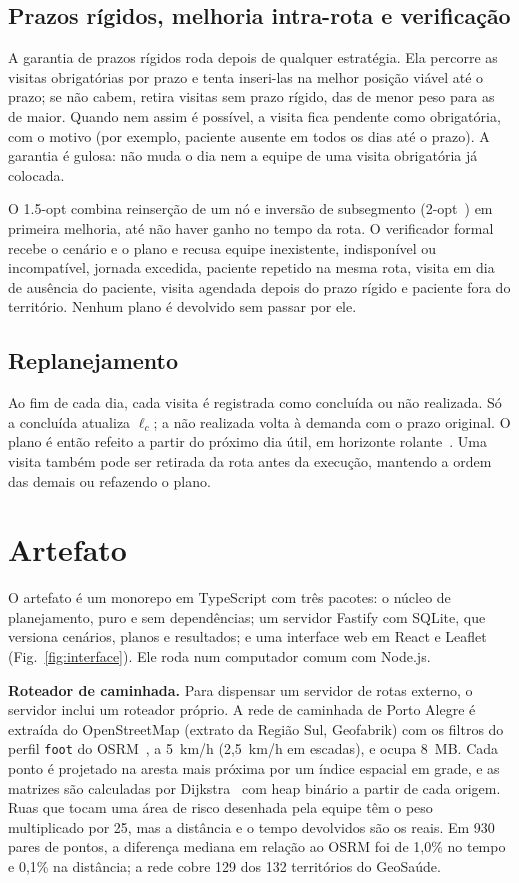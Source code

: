 \documentclass[conference,a4paper]{IEEEtran}
\begin{document}
\subsection{Prazos rígidos, melhoria intra-rota e verificação}

A garantia de prazos rígidos roda depois de qualquer estratégia. Ela percorre as visitas obrigatórias por prazo e tenta inseri-las na melhor posição viável até o prazo; se não cabem, retira visitas sem prazo rígido, das de menor peso para as de maior. Quando nem assim é possível, a visita fica pendente como obrigatória, com o motivo (por exemplo, paciente ausente em todos os dias até o prazo). A garantia é gulosa: não muda o dia nem a equipe de uma visita obrigatória já colocada.

O 1.5-opt combina reinserção de um nó e inversão de subsegmento (2-opt~\cite{croes1958}) em primeira melhoria, até não haver ganho no tempo da rota. O verificador formal recebe o cenário e o plano e recusa equipe inexistente, indisponível ou incompatível, jornada excedida, paciente repetido na mesma rota, visita em dia de ausência do paciente, visita agendada depois do prazo rígido e paciente fora do território. Nenhum plano é devolvido sem passar por ele.

\subsection{Replanejamento}

Ao fim de cada dia, cada visita é registrada como concluída ou não realizada. Só a concluída atualiza $\ell_c$; a não realizada volta à demanda com o prazo original. O plano é então refeito a partir do próximo dia útil, em horizonte rolante~\cite{pillac2013}. Uma visita também pode ser retirada da rota antes da execução, mantendo a ordem das demais ou refazendo o plano.

\section{Artefato}\label{sec:artefato}

O artefato é um monorepo em TypeScript com três pacotes: o núcleo de planejamento, puro e sem dependências; um servidor Fastify com SQLite, que versiona cenários, planos e resultados; e uma interface web em React e Leaflet (Fig.~\ref{fig:interface}). Ele roda num computador comum com Node.js.

\textbf{Roteador de caminhada.} Para dispensar um servidor de rotas externo, o servidor inclui um roteador próprio. A rede de caminhada de Porto Alegre é extraída do OpenStreetMap (extrato da Região Sul, Geofabrik) com os filtros do perfil \texttt{foot} do OSRM~\cite{luxen2011}, a 5~km/h (2,5~km/h em escadas), e ocupa 8~MB. Cada ponto é projetado na aresta mais próxima por um índice espacial em grade, e as matrizes são calculadas por Dijkstra~\cite{dijkstra1959} com heap binário a partir de cada origem. Ruas que tocam uma área de risco desenhada pela equipe têm o peso multiplicado por 25, mas a distância e o tempo devolvidos são os reais. Em 930 pares de pontos, a diferença mediana em relação ao OSRM foi de 1,0\% no tempo e 0,1\% na distância; a rede cobre 129 dos 132 territórios do GeoSaúde.
\end{document}
